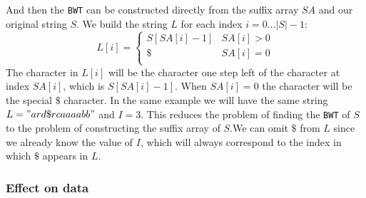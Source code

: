 \documentclass{article}
\begin{document}
And then the \texttt{BWT} can be constructed directly from the suffix array \(SA\) and our original string \(S\). We build the string \(L\) for each index \(i = 0 \dots |S|-1\):
\[
    L[i] = \begin{cases} 
        S[SA[i] - 1] & SA[i] > 0 \\
        \$ & SA[i] = 0 \\
   \end{cases}
\]
The character in \(L[i]\) will be the character one step left of the character at index \(SA[i]\), which is \(S[SA[i] - 1]\). When \(SA[i] = 0\) the character will be the special \(\$\) character. In the same example we will have the same string \(L = "ard\$rcaaaabb"\) and \(I = 3\).
This reduces the problem of finding the \texttt{BWT} of \(S\) to the problem of constructing the suffix array of \(S\).We can omit \(\$\) from \(L\) since we already know the value of \(I\), which will always correspond to the index in which \(\$\) appears in \(L\).

\subsubsection{Effect on data}
\end{document}
